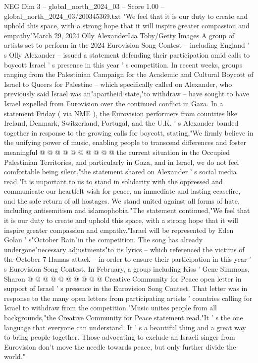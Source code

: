 \begin{textsample}{NEG Dim 3 – global\_north\_2024\_03 – Score 1.00 – global\_north\_2024\_03/200345369.txt}  \label{ex:f3_neg_166}
"We feel that it is our duty to create and uphold this space, with a strong hope that it will inspire greater compassion and empathy"March 29, 2024 Olly AlexanderLia Toby/Getty Images A group of artists set to perform in the 2024 Eurovision Song Contest -- including England ' s Olly Alexander -- issued a statement defending their participation amid calls to boycott Israel ' s presence in this year ' s competition.
In recent weeks, groups ranging from the Palestinian Campaign for the Academic and Cultural Boycott of Israel to Queers for Palestine -- which specifically called on Alexander, who previously said Israel was an"apartheid state,"to withdraw -- have sought to have Israel expelled from Eurovision over the continued conflict in Gaza.
In a statement Friday ( via NME ), the Eurovision performers from countries like Ireland, Denmark, Switzerland, Portugal, and the U.K. ' s Alexander banded together in response to the growing calls for boycott, stating,"We firmly believe in the unifying power of music, enabling people to transcend differences and foster meaningful @ @ @ @ @ @ @ @ @ @ the current situation in the Occupied Palestinian Territories, and particularly in Gaza, and in Israel, we do not feel comfortable being silent,"the statement shared on Alexander ' s social media read."It is important to us to stand in solidarity with the oppressed and communicate our heartfelt wish for peace, an immediate and lasting ceasefire, and the safe return of all hostages.
We stand united against all forms of hate, including antisemitism and islamophobia."The statement continued,"We feel that it is our duty to create and uphold this space, with a strong hope that it will inspire greater compassion and empathy."Israel will be represented by Eden Golan ' s"October Rain"in the competition.
The song has already undergone"necessary adjustments"to its lyrics -- which referenced the victims of the October 7 Hamas attack -- in order to ensure their participation in this year ' s Eurovision Song Contest.
In February, a group including Kiss ' Gene Simmons, Sharon @ @ @ @ @ @ @ @ @ @ Creative Community for Peace open letter in support of Israel ' s presence in the Eurovision Song Contest.
That letter was in response to the many open letters from participating artists ' countries calling for Israel to withdraw from the competition."Music unites people from all backgrounds,"the Creative Community for Peace statement read."It ' s the one language that everyone can understand.
It ' s a beautiful thing and a great way to bring people together.
Those advocating to exclude an Israeli singer from Eurovision don't move the needle towards peace, but only further divide the world."

\end{textsample}
